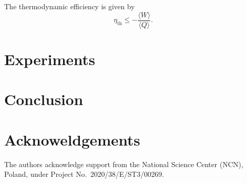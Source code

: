 \documentclass[%
 reprint,
 amsmath,amssymb,
 aps,
]{revtex4-2}
\begin{document}
The thermodynamic efficiency is given by 
\begin{equation}
    \eta_{\text{th}} \leq - \frac{ \langle W \rangle}{ \langle Q \rangle}.
\end{equation}
\section{\label{Experiments} Experiments}

\section{\label{conclusion} Conclusion}

\section{Acknoweldgements}
The authors acknowledge support from the National Science Center (NCN), Poland, under Project No.~2020/38/E/ST3/00269.



\end{document}

